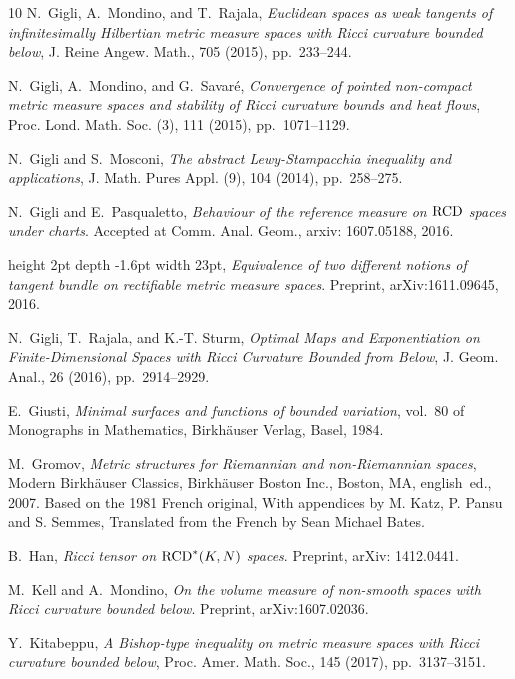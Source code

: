 \documentclass[reqno,11pt]{article}
\numberwithin{equation}{section}
\begin{document}
\begin{thebibliography}{10}
{\sc N.~Gigli, A.~Mondino, and T.~Rajala}, {\em Euclidean spaces as weak
  tangents of infinitesimally {H}ilbertian metric measure spaces with {R}icci
  curvature bounded below}, J. Reine Angew. Math., 705 (2015), pp.~233--244.

{\sc N.~Gigli, A.~Mondino, and G.~Savar\'e}, {\em Convergence of pointed
  non-compact metric measure spaces and stability of {R}icci curvature bounds
  and heat flows}, Proc. Lond. Math. Soc. (3), 111 (2015), pp.~1071--1129.

{\sc N.~Gigli and S.~Mosconi}, {\em The abstract {L}ewy-{S}tampacchia
  inequality and applications}, J. Math. Pures Appl. (9), 104 (2014),
  pp.~258--275.

{\sc N.~Gigli and E.~Pasqualetto}, {\em Behaviour of the reference measure on
  {${\rm RCD}$} spaces under charts}.
\newblock Accepted at Comm. Anal. Geom., arxiv: 1607.05188, 2016.

\leavevmode\vrule height 2pt depth -1.6pt width 23pt, {\em Equivalence of two
  different notions of tangent bundle on rectifiable metric measure spaces}.
\newblock Preprint, arXiv:1611.09645, 2016.

{\sc N.~Gigli, T.~Rajala, and K.-T. Sturm}, {\em Optimal {M}aps and
  {E}xponentiation on {F}inite-{D}imensional {S}paces with {R}icci {C}urvature
  {B}ounded from {B}elow}, J. Geom. Anal., 26 (2016), pp.~2914--2929.

{\sc E.~Giusti}, {\em Minimal surfaces and functions of bounded variation},
  vol.~80 of Monographs in Mathematics, Birkh\"auser Verlag, Basel, 1984.

{\sc M.~Gromov}, {\em Metric structures for {R}iemannian and non-{R}iemannian
  spaces}, Modern Birkh\"auser Classics, Birkh\"auser Boston Inc., Boston, MA,
  english~ed., 2007.
\newblock Based on the 1981 French original, With appendices by M. Katz, P.
  Pansu and S. Semmes, Translated from the French by Sean Michael Bates.

{\sc B.~Han}, {\em Ricci tensor on {${\rm RCD}^*(K,N)$} {spaces}}.
\newblock Preprint, arXiv: 1412.0441.

{\sc M.~Kell and A.~Mondino}, {\em On the volume measure of non-smooth spaces
  with {R}icci curvature bounded below}.
\newblock Preprint, arXiv:1607.02036.

{\sc Y.~Kitabeppu}, {\em A {B}ishop-type inequality on metric measure spaces
  with {R}icci curvature bounded below}, Proc. Amer. Math. Soc., 145 (2017),
  pp.~3137--3151.


\end{thebibliography}
\end{document}
